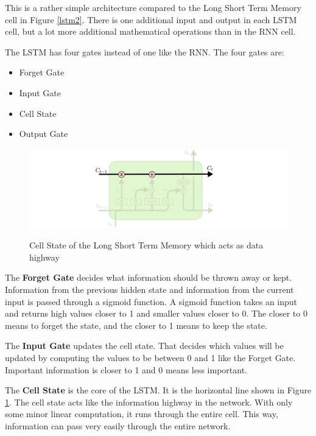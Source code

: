 This is a rather simple architecture compared to the Long Short Term Memory cell in Figure \ref{lstm2}. There is one additional input and output in each LSTM cell, but a lot more additional mathematical operations than in the RNN cell.

The LSTM has four gates instead of one like the RNN. The four gates are:

\begin{itemize}        
	\item Forget Gate
	\item Input Gate
	\item Cell State
	\item Output Gate
\end{itemize}

\begin{figure}
	\begin{center}
		\includegraphics[width=4.5in]{photos/LSTM3-C-line}\\
		\caption{Cell State of the Long Short Term Memory which acts as data highway \cite{olah}}\label{lstm3}
	\end{center}
\end{figure}

The \textbf{Forget Gate} decides what information should be thrown away or kept. Information from the previous hidden state and information from the current input is passed through a sigmoid function. A sigmoid function takes an input and returns high values closer to 1 and smaller values closer to 0. The closer to 0 means to forget the state, and the closer to 1 means to keep the state.

The \textbf{Input Gate} updates the cell state. That decides which values will be updated by computing the values to be between 0 and 1 like the Forget Gate. Important information is closer to 1 and 0 means less important.

The \textbf{Cell State} is the core of the LSTM. It is the horizontal line shown in Figure \ref{lstm3}. The cell state acts like the information highway in the network. With only some minor linear computation, it runs through the entire cell. This way, information can pass very easily through the entire network. 

